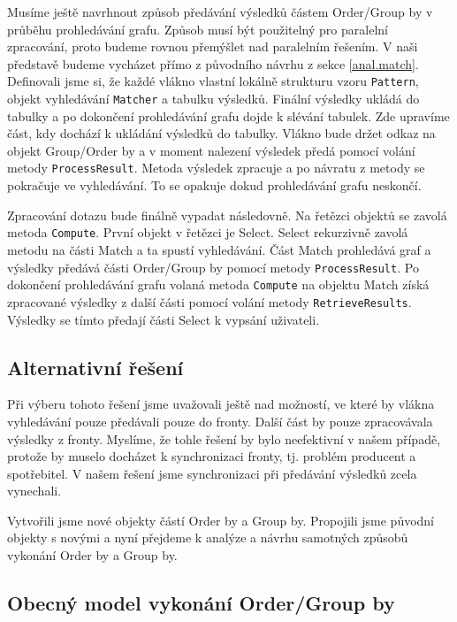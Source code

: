 Musíme ještě navrhnout způsob předávání výsledků částem Order/Group by v průběhu prohledávání grafu.
Způsob musí být použitelný pro paralelní zpracování, proto budeme rovnou přemýšlet nad paralelním řešením.
V naši představě budeme vycházet přímo z původního návrhu z sekce \ref{anal.match}.
Definovali jsme si, že každé vlákno vlastní lokálně strukturu vzoru \texttt{Pattern}, objekt vyhledávání \texttt{Matcher} a tabulku výsledků.
Finální výsledky ukládá do tabulky a po dokončení prohledávání grafu dojde k slévání tabulek.
Zde upravíme část, kdy dochází k ukládání výsledků do tabulky.
Vlákno bude držet odkaz na objekt Group/Order by a v moment nalezení výsledek předá pomocí volání metody \texttt{ProcessResult}.
Metoda výsledek zpracuje a po návratu z metody se pokračuje ve vyhledávání.
To se opakuje dokud prohledávání grafu neskončí.

Zpracování dotazu bude finálně vypadat následovně.
Na řetězci objektů se zavolá metoda \texttt{Compute}.
První objekt v řetězci je Select.
Select rekurzivně zavolá metodu na části Match a ta spustí vyhledávání.
Část Match prohledává graf a výsledky předává části Order/Group by pomocí metody \texttt{ProcessResult}.
Po dokončení prohledávání grafu volaná metoda \texttt{Compute} na objektu Match získá zpracované výsledky z další části pomocí volání metody \texttt{RetrieveResults}.
Výsledky se tímto předají části Select k vypsání uživateli. 

\subsection{Alternativní řešení}

Při výberu tohoto řešení jsme uvažovali ještě nad možností, ve které by vlákna vyhledávání pouze předávali pouze do fronty.
Další část by pouze zpracovávala výsledky z fronty.
Myslíme, že tohle řešení by bylo neefektivní v našem případě, protože by muselo docházet k synchronizaci fronty, tj. problém producent a spotřebitel.
V našem řešení jsme synchronizaci při předávání výsledků zcela vynechali.

Vytvořili jsme nové objekty částí Order by a Group by.
Propojili jsme původní objekty s novými a nyní přejdeme k analýze a návrhu samotných způsobů vykonání Order by a Group by.

\subsection{Obecný model vykonání Order/Group by}

